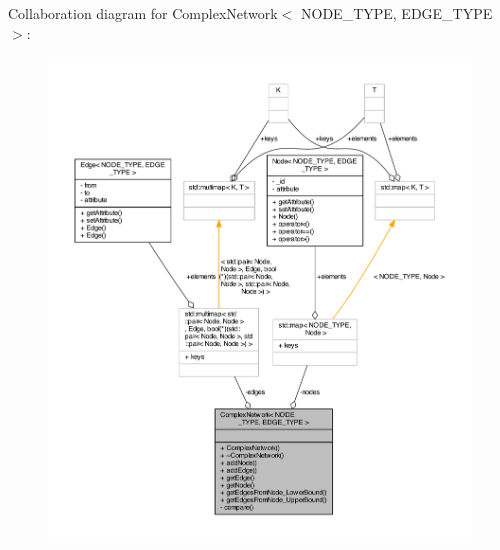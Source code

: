 Collaboration diagram for Complex\+Network$<$ N\+O\+D\+E\+\_\+\+T\+Y\+P\+E, E\+D\+G\+E\+\_\+\+T\+Y\+P\+E $>$\+:
\nopagebreak
\begin{figure}[H]
\begin{center}
\leavevmode
\includegraphics[width=350pt]{class_complex_network__coll__graph}
\end{center}
\end{figure}
